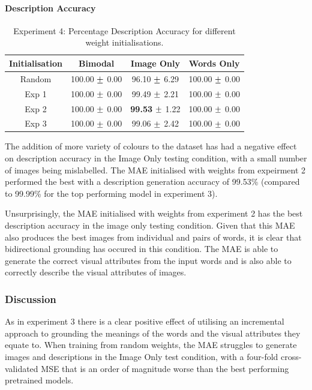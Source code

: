 \paragraph{Description Accuracy}


\begin{table}[h!]
\centering
	\begin{tabular}{|c|c|c|c|}
	\hline
	\textbf{Initialisation} & 	\textbf{Bimodal} & 	\textbf{Image Only} 	& 	\textbf{Words Only} \\ \hline
Random 	&	100.00	$\mypm$	0.00	&	96.10	$\mypm$	6.29	&	100.00	$\mypm$	0.00	\\ \hline
Exp 1	&	100.00	$\mypm$	0.00	&	99.49	$\mypm$	2.21	&	100.00	$\mypm$	0.00	\\ \hline
Exp 2	&	100.00	$\mypm$	0.00	&	\textbf{99.53}	$\mypm$	1.22	&	100.00	$\mypm$	0.00\\ \hline
Exp 3	&	100.00	$\mypm$	0.00	&	99.06	$\mypm$	2.42	&	100.00	$\mypm$	0.00\\ \hline

	\end{tabular}
\caption{Experiment 4: Percentage Description Accuracy for different weight initialisations.}
\label{tab:res739acc}
\end{table}

The addition of more variety of colours to the dataset has had a negative effect on description accuracy in the Image Only testing condition, with a small number of images being mislabelled. The \ac{MAE} initialised with weights from expeirment 2 performed the best with a description generation accuracy of 99.53\% (compared to 99.99\% for the top performing model in experiment 3).

Unsurprisingly, the \ac{MAE} initialised with weights from experiment 2 has the best description accuracy in the image only testing condition. Given that this \ac{MAE} also produces the best images from individual and pairs of words, it is clear that bidirectional grounding has occured in this condition. The \ac{MAE} is able to generate the correct visual attributes from the input words and is also able to correctly describe the visual attributes of images.

\subsubsection{Discussion}
As in experiment 3 there is a clear positive effect of utilising an incremental approach to grounding the meanings of the words and the visual attributes they equate to. 
When training from random weights, the \ac{MAE} struggles to generate images and descriptions in the Image Only test condition, with a four-fold cross-validated \ac{MSE} that is an order of magnitude worse than the best performing pretrained models.

